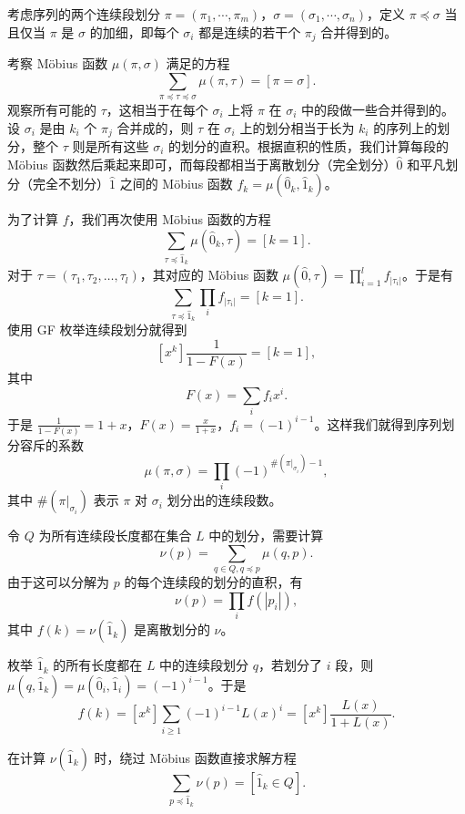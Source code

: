 \begin{example}[序列划分容斥]
    考虑序列的两个连续段划分 $\pi=(\pi_1,\cdots,\pi_m)$，$\sigma=(\sigma_1,\cdots,\sigma_n)$，定义 $\pi\preceq \sigma$ 当且仅当 $\pi$ 是 $\sigma$ 的加细，即每个 $\sigma_i$ 都是连续的若干个 $\pi_j$ 合并得到的。

    考察 M{\"o}bius 函数 $\mu(\pi,\sigma)$ 满足的方程
    $$
    \sum_{\pi\preceq \tau\preceq \sigma}\mu(\pi,\tau)=[\pi=\sigma].
    $$
    观察所有可能的 $\tau$，这相当于在每个 $\sigma_i$ 上将 $\pi$ 在 $\sigma_i$ 中的段做一些合并得到的。设 $\sigma_i$ 是由 $k_i$ 个 $\pi_j$ 合并成的，则 $\tau$ 在 $\sigma_i$ 上的划分相当于长为 $k_i$ 的序列上的划分，整个 $\tau$ 则是所有这些 $\sigma_i$ 的划分的直积。根据直积的性质，我们计算每段的 M{\"o}bius 函数然后乘起来即可，而每段都相当于离散划分（完全划分）$\hat 0$ 和平凡划分（完全不划分）$\hat 1$ 之间的 M{\"o}bius 函数 $f_k=\mu(\hat 0_k,\hat 1_k)$。
    
    为了计算 $f$，我们再次使用 M{\"o}bius 函数的方程
    $$
    \sum_{\tau\preceq \hat 1_k}\mu(\hat 0_k,\tau)=[k=1].
    $$
    对于 $\tau=(\tau_1,\tau_2,\ldots,\tau_l)$，其对应的 M{\"o}bius 函数 $\mu(\hat 0,\tau)=\prod_{i=1}^l f_{|\tau_i|}$。于是有
    $$
    \sum_{\tau\preceq \hat 1_k}\prod_{i} f_{|\tau_i|}=[k=1].
    $$
    使用 GF 枚举连续段划分就得到
    $$
    \left[x^k\right]\frac{1}{1-F(x)}=[k=1],
    $$
    其中
    $$
    F(x)=\sum_i f_ix^i.
    $$
    于是 $\frac{1}{1-F(x)}=1+x$，$F(x)=\frac{x}{1+x}$，$f_i=(-1)^{i-1}$。这样我们就得到序列划分容斥的系数 
    $$
    \mu(\pi,\sigma)=\prod_{i}(-1)^{\#(\pi|_{\sigma_i})-1},
    $$
    其中 $\#(\pi|_{\sigma_i})$ 表示 $\pi$ 对 $\sigma_i$ 划分出的连续段数。
\end{example}
\begin{corollary}
    令 $Q$ 为所有连续段长度都在集合 $L$ 中的划分，需要计算
    $$
    \nu(p)=\sum_{q\in Q,q\preceq p}\mu(q,p).
    $$
    由于这可以分解为 $p$ 的每个连续段的划分的直积，有
    $$
    \nu(p)=\prod_i f(|p_i|),
    $$
    其中 $f(k)=\nu(\hat 1_k)$ 是离散划分的 $\nu$。

    枚举 $\hat 1_k$ 的所有长度都在 $L$ 中的连续段划分 $q$，若划分了 $i$ 段，则 $\mu(q,\hat 1_k)=\mu(\hat 0_i,\hat 1_i)=(-1)^{i-1}$。于是
    $$
    f(k)=[x^k]\sum_{i\ge 1}(-1)^{i-1}L(x)^i=[x^k]\frac{L(x)}{1+L(x)}.
    $$
\end{corollary}
\begin{exercise}
    在计算 $\nu(\hat 1_k)$ 时，绕过 M{\"o}bius 函数直接求解方程
    $$
    \sum_{p\preceq \hat 1_k}\nu(p)=[\hat 1_k\in Q].
    $$
\end{exercise}

